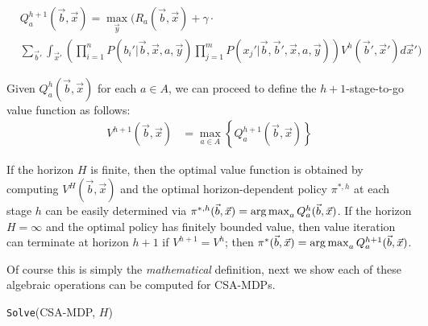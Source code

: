 {\footnotesize
\begin{align}
& Q_a^{h+1}(\vec{b},\vec{x}) = \max_{\vec{y}} \Bigg( R_a(\vec{b},\vec{x}) + \gamma \cdot \label{eq:qfun} \\ 
& \sum_{\vec{b}'} \int_{\vec{x}'} \left( \prod_{i=1}^n P(b_i'|\vec{b},\vec{x},a,\vec{y}) \prod_{j=1}^m P(x_j'|\vec{b},\vec{b}',\vec{x},a,\vec{y}) \right) V^h(\vec{b}',\vec{x}') d\vec{x}' \Bigg) \nonumber
\end{align}}

Given $Q_a^h(\vec{b},\vec{x})$ for each $a \in A$, we can proceed
to define the $h+1$-stage-to-go value function as follows:
\begin{align}
V^{h+1}(\vec{b},\vec{x}) & = \max_{a \in A} \left\{ Q^{h+1}_a(\vec{b},\vec{x}) \right\} \label{eq:vfun}
\end{align}

If the horizon $H$ is finite, then the optimal value function is
obtained by computing $V^H(\vec{b},\vec{x})$ and the optimal
horizon-dependent policy $\pi^{*,h}$ at each stage $h$ can be easily
determined via 
$\pi^{*,h}(\vec{b},\vec{x}) = \argmax_a Q^h_a(\vec{b},\vec{x})$.  
If the horizon 
$H = \infty$ and the optimal policy has finitely bounded value, 
then value iteration can terminate at horizon $h+1$ if 
$V^{h+1} = V^{h}$; then 
$\pi^*(\vec{b},\vec{x}) = \argmax_a Q^{h+1}_a(\vec{b},\vec{x})$.

Of course this is simply the \emph{mathematical} definition, next
we show each of these algebraic operations can be computed for
CSA-MDPs.


\incmargin{.5em}
\linesnumbered
\begin{algorithm}[t!]
\dontprintsemicolon
{}
\caption{\footnotesize \texttt{Solve}(CSA-MDP, $H$) \label{alg:vi}}
\end{algorithm}
\decmargin{.5em}

